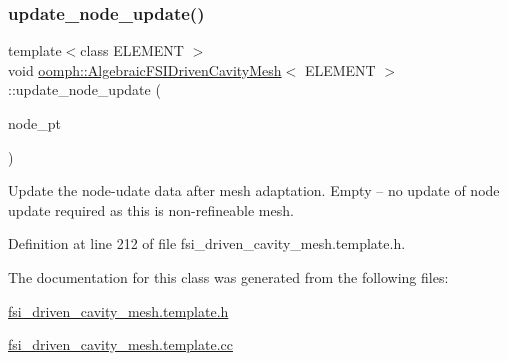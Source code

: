 \subsubsection{\texorpdfstring{update\+\_\+node\+\_\+update()}{update\_node\_update()}}
{\footnotesize\ttfamily template$<$class E\+L\+E\+M\+E\+NT $>$ \\
void \hyperlink{classoomph_1_1AlgebraicFSIDrivenCavityMesh}{oomph\+::\+Algebraic\+F\+S\+I\+Driven\+Cavity\+Mesh}$<$ E\+L\+E\+M\+E\+NT $>$\+::update\+\_\+node\+\_\+update (\begin{DoxyParamCaption}\item[{Algebraic\+Node $\ast$\&}]{node\+\_\+pt }\end{DoxyParamCaption})\hspace{0.3cm}{\ttfamily [inline]}}



Update the node-\/udate data after mesh adaptation. Empty -- no update of node update required as this is non-\/refineable mesh. 



Definition at line 212 of file fsi\+\_\+driven\+\_\+cavity\+\_\+mesh.\+template.\+h.



The documentation for this class was generated from the following files\+:\begin{DoxyCompactItemize}
\item 
\hyperlink{fsi__driven__cavity__mesh_8template_8h}{fsi\+\_\+driven\+\_\+cavity\+\_\+mesh.\+template.\+h}\item 
\hyperlink{fsi__driven__cavity__mesh_8template_8cc}{fsi\+\_\+driven\+\_\+cavity\+\_\+mesh.\+template.\+cc}\end{DoxyCompactItemize}
